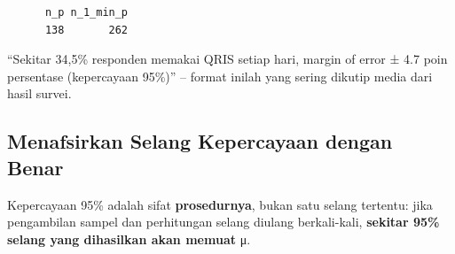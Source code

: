 \documentclass[
  indonesian,
  letterpaper,
]{book}
\begin{document}
\begin{verbatim}
      n_p n_1_min_p 
      138       262 
\end{verbatim}

``Sekitar 34,5\% responden memakai QRIS setiap hari, margin of error ±
4.7 poin persentase (kepercayaan 95\%)'' -- format inilah yang sering
dikutip media dari hasil survei.

\subsection{Menafsirkan Selang Kepercayaan dengan
Benar}\label{menafsirkan-selang-kepercayaan-dengan-benar}

Kepercayaan 95\% adalah sifat \textbf{prosedurnya}, bukan satu selang
tertentu: jika pengambilan sampel dan perhitungan selang diulang
berkali-kali, \textbf{sekitar 95\% selang yang dihasilkan akan memuat}
μ.
\end{document}
